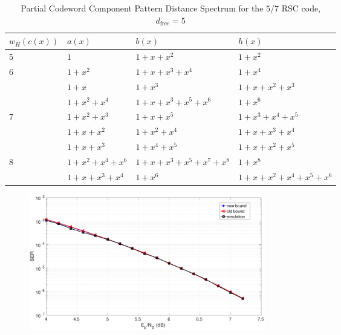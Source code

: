 \begin{table}[htbp]
 \caption{Partial Codeword Component Pattern Distance Spectrum for the $5/7$ RSC code, $d_{\text{free}}=5$}
\centering
 \begin{tabularx}{0.75\textwidth}{Xlll} 
 \hline
 $w_H(c(x))$& $a(x)$ & $b(x)$ & $h(x)$ \\ %
 \hline\hline
5&$1$ & $1+x+x^{2}$ & $1+x^2$\\
\hline\hline
6&$1+x^2$ & $1+x+x^3+x^4$ & $1+x^{4}$\\
&$1+x$ & $1+x^3$ & $1+x+x^2+x^3$\\
\hline\hline
&$1+x^2+x^4$ & $1+x+x^3+x^5+x^6$ & $1+x^{6}$\\
7&$1+x^2+x^3$ & $1+x+x^5$ & $1+x^3+x^4+x^5$\\
&$1+x+x^2$ & $1+x^2+x^4$ & $1+x+x^3+x^4$\\
&$1+x+x^3$ & $1+x^4+x^5$ & $1+x+x^2+x^5$\\
\hline \hline
8&$1+x^2+x^4+x^6$ & $1+x+x^3+x^5+x^7+x^8$ & $1+x^8$\\
&$1+x+x^3+x^4$ & $1+x^6$ & $1+x+x^2+x^4+x^5+x^6$\\
\hline
 \end{tabularx}
 
 \label{novelTab13}
\end{table}

\begin{figure}[htbp]
\centering
		\includegraphics[width=0.5\textwidth]{./Images/RSC_5_7_lower_weights.eps}
		\label{simFig1}
		\end{figure}
		
